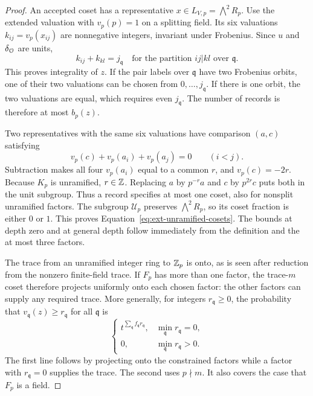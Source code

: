 \begin{proof}
An accepted coset has a representative \(x\in L_{V,p}=\bigwedge^2 R_p\).
Use the extended valuation with \(v_p(p)=1\) on a splitting field.
Its six valuations \(k_{ij}=v_p(x_{ij})\) are nonnegative integers,
invariant under Frobenius.  Since \(u\) and \(\delta_{\mathcal O}\) are units,
\[
 k_{ij}+k_{kl}=j_{\mathfrak q}
 \quad\text{for the partition }ij|kl\text{ over }\mathfrak q .
\]
This proves integrality of \(z\).  If the pair labels over
\(\mathfrak q\) have two Frobenius orbits, one of their two valuations
can be chosen from \(0,\ldots,j_{\mathfrak q}\).  If there is one orbit,
the two valuations are equal, which requires even \(j_{\mathfrak q}\).
The number of records is therefore at most \(b_p(z)\).

Two representatives with the same six valuations have comparison
\((a,c)\) satisfying
\[
 v_p(c)+v_p(a_i)+v_p(a_j)=0\qquad(i<j).
\]
Subtraction makes all four \(v_p(a_i)\) equal to a common \(r\), and
\(v_p(c)=-2r\).  Because \(K_p\) is unramified, \(r\in\mathbb Z\).
Replacing \(a\) by \(p^{-r}a\) and \(c\) by \(p^{2r}c\) puts both in
the unit subgroup.  Thus a record specifies at most one coset, also
for nonsplit unramified factors.  The subgroup \(\mathscr U_p\)
preserves \(\bigwedge^2R_p\), so its coset fraction is either \(0\)
or \(1\).  This proves Equation~\eqref{eq:ext-unramified-cosets}.
The bounds at depth zero and at general depth follow immediately
from the definition and the at most three factors.

The trace from an unramified integer ring to \(\mathbb Z_p\) is onto, as is
seen after reduction from the nonzero finite-field trace.  If
\(F_p\) has more than one factor, the trace-\(m\) coset therefore
projects uniformly onto each chosen factor: the other factors can
supply any required trace.  More generally, for integers
\(r_{\mathfrak q}\ge0\), the probability that
\(v_{\mathfrak q}(z)\ge r_{\mathfrak q}\) for all \(\mathfrak q\) is
\[
 \begin{cases}
  t^{\sum_{\mathfrak q}f_{\mathfrak q}r_{\mathfrak q}},
       &\min_{\mathfrak q}r_{\mathfrak q}=0,\\
  0,&\min_{\mathfrak q}r_{\mathfrak q}>0.
 \end{cases}
\]
The first line follows by projecting onto the constrained factors
while a factor with \(r_{\mathfrak q}=0\) supplies the trace.
The second uses \(p\nmid m\).  It also covers the case that \(F_p\)
is a field.


\end{proof}
